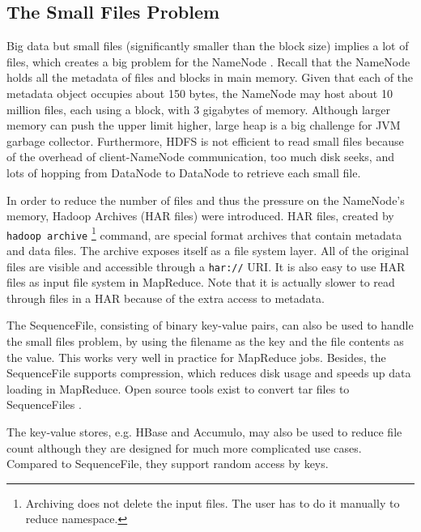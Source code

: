\documentclass[11pt]{book}
\begin{document}
\subsection{The Small Files Problem}
Big data but small files (significantly smaller than the block size) implies a lot of files, which creates a big problem for the NameNode \cite{SmallFiles}. Recall that the NameNode holds all the metadata of files and blocks in main memory. Given that each of the metadata object occupies about 150 bytes, the NameNode may host about 10 million files, each using a block, with 3 gigabytes of memory. Although larger memory can push the upper limit higher, large heap is a big challenge for JVM garbage collector.
Furthermore, HDFS is not efficient to read small files because of the overhead of client-NameNode communication, too much disk seeks, and lots of hopping from DataNode to DataNode to retrieve each small file.

In order to reduce the number of files and thus the pressure on the NameNode's memory, Hadoop Archives (HAR files) were introduced. HAR files, created by \texttt{hadoop archive} \footnote{Archiving does not delete the input files. The user has to do it manually to reduce namespace.} command, are special format archives that contain metadata and data files. The archive exposes itself as a file system layer. All of the original files are visible and accessible through a \texttt{har://} URI. It is also easy to use HAR files as input file system in MapReduce. Note that it is actually slower to read through files in a HAR because of the extra access to metadata.

The SequenceFile, consisting of binary key-value pairs, can also be used to handle the small files problem, by using the filename as the key and the file contents as the value. This works very well in practice for MapReduce jobs. Besides, the SequenceFile supports compression, which reduces disk usage and speeds up data loading in MapReduce. Open source tools exist to convert tar files to SequenceFiles \cite {Tar2Seq}.

The key-value stores, e.g. HBase and Accumulo, may also be used to reduce file count although they are designed for much more complicated use cases. Compared to SequenceFile, they support random access by keys.
\end{document}
